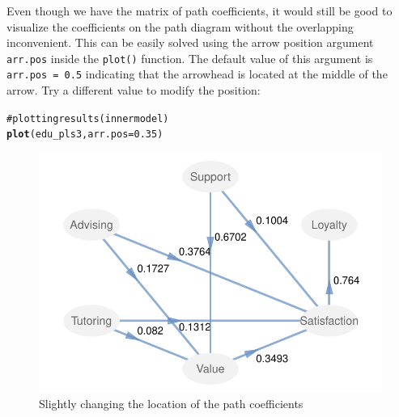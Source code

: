 \documentclass[12pt]{book}\usepackage{graphicx, color}
\makeatletter
\newcommand{\hlfunctioncall}[1]{\textcolor[rgb]{0.501960784313725,0,0.329411764705882}{\textbf{#1}}}%
\newcommand{\hlcomment}[1]{\textcolor[rgb]{0.180392156862745,0.6,0.341176470588235}{#1}}%
\newenvironment{kframe}{%
 \def\at@end@of@kframe{}%
 \ifinner\ifhmode%
  \def\at@end@of@kframe{\end{minipage}}%
  \begin{minipage}{\columnwidth}%
 \fi\fi%
 \def\FrameCommand##1{\hskip\@totalleftmargin \hskip-\fboxsep
 \colorbox{shadecolor}{##1}\hskip-\fboxsep
     \hskip-\linewidth \hskip-\@totalleftmargin \hskip\columnwidth}%
 \MakeFramed {\advance\hsize-\width
   \@totalleftmargin\z@ \linewidth\hsize
   \@setminipage}}%
 {\par\unskip\endMakeFramed%
 \at@end@of@kframe}
\newenvironment{knitrout}{}{} %
\newcommand{\code}[1]{\texttt{#1}}
\makeatother
\begin{document}
Even though we have the matrix of path coefficients, it would still be good to visualize the coefficients on the path diagram without the overlapping inconvenient. This can be easily solved using the arrow position argument \code{arr.pos} inside the \code{plot()} function. The default value of this argument is \code{arr.pos = 0.5} indicating that the arrowhead is located at the middle of the arrow. Try a different value to modify the position:
\begin{knitrout}
\color{fgcolor}\begin{kframe}
\begin{alltt}
\hlcomment{# plotting results (inner model)}
\hlfunctioncall{plot}(edu_pls3, arr.pos = 0.35)
\end{alltt}
\end{kframe}\begin{figure}[h]


{\centering \includegraphics[width=.8\linewidth,height=.5\linewidth]{figure/edu_pls3_plot_inner2} 

}

\caption[Slightly changing the location of the path coefficients]{Slightly changing the location of the path coefficients\label{fig:edu_pls3_plot_inner2}}
\end{figure}


\end{knitrout}
\end{document}
